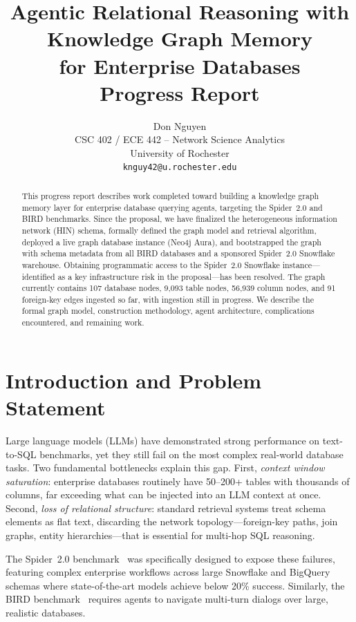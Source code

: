 \documentclass[11pt]{article}
\title{
Agentic Relational Reasoning with Knowledge Graph Memory \\
for Enterprise Databases \\
\large Progress Report
}
\author{
  Don Nguyen \\
  CSC 402 / ECE 442 -- Network Science Analytics \\
  University of Rochester \\
  \texttt{knguy42@u.rochester.edu}
}
\begin{document}
\maketitle

\begin{abstract}
This progress report describes work completed toward building a knowledge graph memory layer for enterprise database querying agents, targeting the Spider~2.0 and BIRD benchmarks.
Since the proposal, we have finalized the heterogeneous information network (HIN) schema, formally defined the graph model and retrieval algorithm, deployed a live graph database instance (Neo4j Aura), and bootstrapped the graph with schema metadata from all BIRD databases and a sponsored Spider~2.0 Snowflake warehouse.
Obtaining programmatic access to the Spider~2.0 Snowflake instance---identified as a key infrastructure risk in the proposal---has been resolved.
The graph currently contains 107 database nodes, 9{,}093 table nodes, 56{,}939 column nodes, and 91 foreign-key edges ingested so far, with ingestion still in progress.
We describe the formal graph model, construction methodology, agent architecture, complications encountered, and remaining work.
\end{abstract}

\section{Introduction and Problem Statement}

Large language models (LLMs) have demonstrated strong performance on text-to-SQL benchmarks, yet they still fail on the most complex real-world database tasks.
Two fundamental bottlenecks explain this gap.
First, \emph{context window saturation}: enterprise databases routinely have 50--200+ tables with thousands of columns, far exceeding what can be injected into an LLM context at once.
Second, \emph{loss of relational structure}: standard retrieval systems treat schema elements as flat text, discarding the network topology---foreign-key paths, join graphs, entity hierarchies---that is essential for multi-hop SQL reasoning.

The Spider~2.0 benchmark~\cite{yu2024spider2} was specifically designed to expose these failures, featuring complex enterprise workflows across large Snowflake and BigQuery schemas where state-of-the-art models achieve below 20\% success.
Similarly, the BIRD benchmark~\cite{li2024bird} requires agents to navigate multi-turn dialogs over large, realistic databases.
\end{document}
